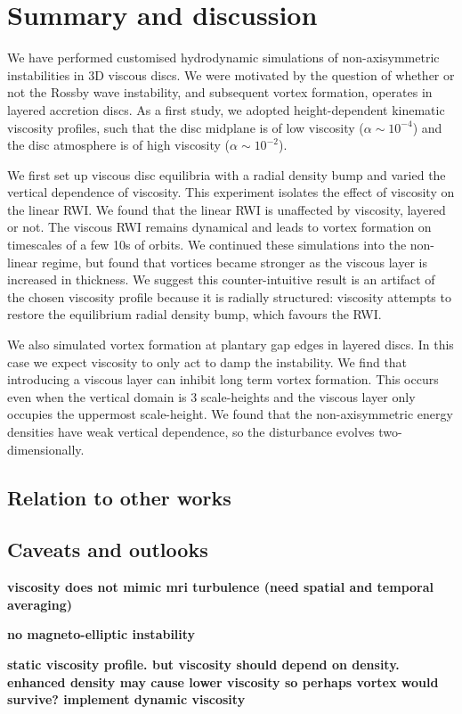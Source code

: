 \section{Summary and discussion}\label{summary}
We have performed customised hydrodynamic simulations of
non-axisymmetric instabilities in 3D viscous discs. We were motivated  
by the question of whether or not the Rossby wave instability, and
subsequent vortex formation, operates in layered accretion discs.  As
a first study, we adopted height-dependent kinematic viscosity
profiles, such that the disc midplane is of low viscosity ($\alpha\sim
10^{-4}$) and the disc atmosphere is of high viscosity ($\alpha\sim
10^{-2}$). 

We first set up viscous disc equilibria with a radial density
bump and varied the vertical dependence of viscosity. 
This experiment isolates the effect of viscosity on the
linear RWI. We found that the linear RWI is unaffected by viscosity,
layered or not. The viscous RWI remains dynamical and leads to vortex
formation on timescales of a few 10s of orbits. We continued these
simulations into the non-linear regime, but found that vortices became
stronger as the viscous layer is increased in thickness. We suggest this
counter-intuitive result is an artifact of the chosen viscosity
profile because it is radially structured: viscosity attempts to
restore the equilibrium radial density bump, which favours the
RWI. 

We also simulated vortex formation at plantary gap edges in layered
discs. In this case we expect viscosity to only act to damp the
instability. We find that introducing a viscous layer can inhibit long
term vortex formation. This occurs even when the vertical domain is 3
scale-heights and the viscous layer only occupies the uppermost
scale-height. We found that the non-axisymmetric energy densities have
weak vertical dependence, so the disturbance evolves
two-dimensionally. 

\subsection{Relation to other works}


\subsection{Caveats and outlooks}\label{caveats}
{\bf viscosity does not mimic mri turbulence (need spatial and
  temporal averaging)}

{\bf no magneto-elliptic instability}

{\bf static viscosity profile. but viscosity should depend on
  density. enhanced density may cause lower viscosity so perhaps vortex would
  survive? implement dynamic viscosity} 


